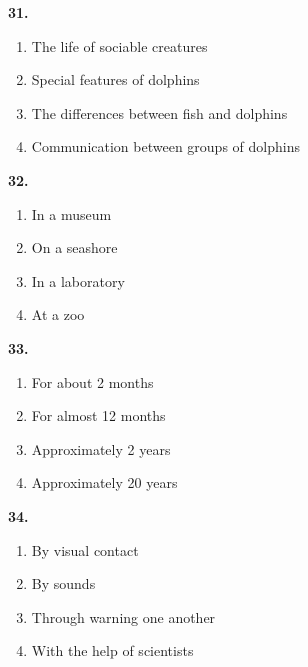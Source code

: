 \documentclass[12pt]{article}
\begin{document}
\noindent\textbf{31.}
\begin{enumerate}[label=(\Alph*),leftmargin=*,itemsep=0.2em]
\item The life of sociable creatures
\item Special features of dolphins
\item The differences between fish and dolphins
\item Communication between groups of dolphins
\end{enumerate}
\par
\vspace{0.25\baselineskip}
\noindent\textbf{32.}
\begin{enumerate}[label=(\Alph*),leftmargin=*,itemsep=0.2em]
\item In a museum
\item On a seashore
\item In a laboratory
\item At a zoo
\end{enumerate}
\par
\vspace{0.25\baselineskip}
\noindent\textbf{33.}
\begin{enumerate}[label=(\Alph*),leftmargin=*,itemsep=0.2em]
\item For about 2 months
\item For almost 12 months
\item Approximately 2 years
\item Approximately 20 years
\end{enumerate}
\par
\vspace{0.25\baselineskip}
\noindent\textbf{34.}
\begin{enumerate}[label=(\Alph*),leftmargin=*,itemsep=0.2em]
\item By visual contact
\item By sounds
\item Through warning one another
\item With the help of scientists
\end{enumerate}
\par
\vspace{0.25\baselineskip}
\end{document}

